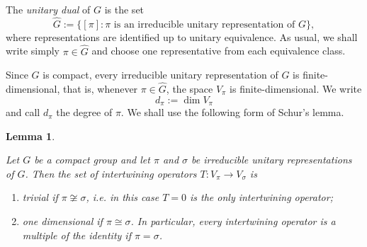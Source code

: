 \documentclass[11pt,showkeys]{amsart}
\newtheorem{lemma}[theorem]{Lemma}
\begin{document}
The \emph{unitary
dual} of \(G\) is the set
\[
        \widehat G
        :=
        \big\{[\pi]:
        \pi \text{ is an irreducible unitary representation of }G
        \big\},
\]
where representations are identified up to unitary equivalence. As usual,
we shall write simply \(\pi\in\widehat G\) and choose one representative
from each equivalence class.

Since \(G\) is compact, every irreducible unitary representation of \(G\)
is finite-dimensional, that is, whenever \(\pi\in\widehat G\), the space
\(V_\pi\) is finite-dimensional. We write
\[
        d_\pi:=\dim V_\pi
\]
and call \(d_\pi\) the degree of \(\pi\).
We shall use the following form of Schur's lemma.

\begin{lemma}
\label{thm:schur-lemma}

Let \(G\) be a compact group and let \(\pi\) and \(\sigma\) be irreducible
unitary representations of \(G\). Then the set of intertwining operators
\(T:V_\pi\to V_\sigma\) is 
\begin{enumerate}
    \item trivial if \(\pi\not\cong\sigma\), i.e. in this case \(T=0\) is the only intertwining operator;
    \item one dimensional if \(\pi\cong\sigma\). In particular, every intertwining operator is a multiple of the identity if  \(\pi=\sigma\).
\end{enumerate}

\end{lemma}
\end{document}
